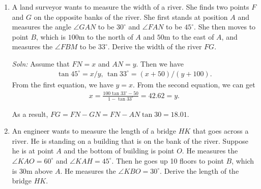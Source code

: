 \documentclass{article}
\begin{document}
\begin{enumerate}
\item A land surveyor wants to measure the width of a river. She finds two points $F$ and $G$ on the opposite banks of the river.  She first stands at position $A$ and measures the angle $\angle GAN$ to be $30^\circ$ and $\angle FAN$ to be $45^\circ$. She then moves to point $B$, which is $100$m to the north of $A$ and $50$m to the east of $A$, and measures the $\angle FBM$ to be $33^\circ$. Derive the width of the river $FG$.
  \begin{figure}[h]
    \centering
  \end{figure}
 
\emph{Soln:} Assume that $FN = x$ and $AN= y$. Then we have
\begin{align*}
 \tan 45^\circ = x/y,\, \tan 33^\circ = (x+50)/(y+100). 
\end{align*}
From the first equation, we have $y = x$. From the second equation, we can get
\begin{align*}
  x = \frac{100\tan 33^\circ-50}{1-\tan 33^\circ} = 42.62 = y.
\end{align*}

As a result, $FG = FN-GN = FN- AN\tan 30 = 18.01.$

\newpage
\item An engineer wants to measure the length of a bridge $HK$ that goes across a river. He is standing on a building that is on the bank of the river. Suppose he is at point $A$ and the bottom of building is point $O$. He measures the $\angle KAO = 60^\circ$ and $\angle KAH = 45^\circ$. Then he goes up 10 floors to point $B$, which is $30$m above $A$. He measures the $\angle KBO = 30^\circ$. Derive the length of the bridge $HK$.


\end{enumerate}
\end{document}
